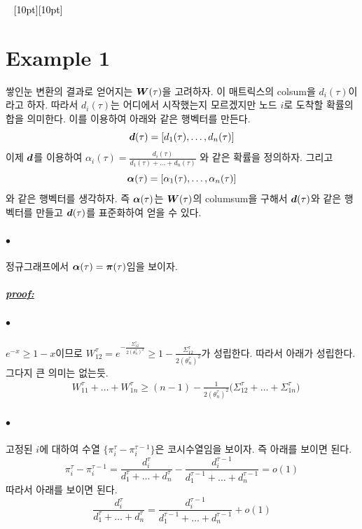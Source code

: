 \documentclass[12pt,oneside,english,a4paper]{article}
\newcommand{\dash}{\noindent \newline\textcolor{black}{\hrulefill~ \raisebox{-2.5pt}[10pt][10pt]{\leafright \decofourleft \decothreeleft  \aldineright \decotwo \floweroneleft \decoone   \floweroneright \decotwo \aldineleft\decothreeright \decofourright \leafleft} ~  \hrulefill}}
\def\ck{\paragraph{\LARGE$\bullet$}\LARGE}
\newcommand{\para}[1]{\paragraph{\LARGE\it\underline{\textbf{#1:}}}\LARGE}
\newcommand{\bs}[1]{\mbox{\boldmath $#1$}}
\newcommand{\bsd}{\mbox{\boldmath $d$}}
\newcommand{\bsW}{\mbox{\boldmath $W$}}
\begin{document}



\dash
\section{Example 1}
쌓인눈 변환의 결과로 얻어지는 $\bsW(\tau)$을 고려하자. 이 매트릭스의 colsum을 $d_i(\tau)$이라고 하자. 따라서 $d_i(\tau)$는 어디에서 시작했는지 모르겠지만 노드 $i$로 도착할 확률의 합을 의미한다. 이를 이용하여 아래와 같은 행벡터를 만든다. 
\[
\bsd(\tau)=[d_1(\tau),\dots,d_n(\tau)]
\]
이제 $\bsd$를 이용하여 
$
\alpha_i(\tau)=\frac{d_i(\tau)}{d_1(\tau)+\dots+d_n(\tau)}
$
와 같은 확률을 정의하자. 그리고 
\[
\bs{\alpha}(\tau)=[\alpha_1(\tau),\dots, \alpha_n(\tau)]\]
와 같은 행벡터를 생각하자. 즉 $\bs{\alpha}(\tau)$는 $\bsW(\tau)$의 columsum을 구해서 $\bsd(\tau)$와 같은 행벡터를 만들고 $\bsd(\tau)$를 표준화하여 얻을 수 있다. 

\ck 정규그래프에서 $\bs{\alpha}(\tau)=\bs{\pi}(\tau)$임을 보이자. 


\para{proof}
\ck $e^{-x} \geq 1-x $이므로 $W_{12}^{\tau}=e^{-\frac{\Sigma_{12}^\tau}{2(\theta_n^\tau)^2}}\geq 1-\frac{\Sigma_{12}^\tau}{2(\theta_n^\tau)^2}$가 성립한다. 따라서 아래가 성립한다. 그다지 큰 의미는 없는듯. 
\begin{align*}
& W_{11}^{\tau}+\dots+W_{1n}^{\tau} 
\geq (n-1)-\frac{1}{2(\theta_n^\tau)^2}\big(\Sigma_{12}^{\tau}+\dots+\Sigma_{1n}^{\tau}\big)
\end{align*}

\ck 고정된 $i$에 대하여 수열 $\big\{\pi_i^{\tau}-\pi_i^{\tau-1}\big\}$은 코시수열임을 보이자. 즉 아래를 보이면 된다. 
\[
\pi_i^{\tau}-\pi_i^{\tau-1}=\frac{d_i^{\tau}}{d_1^{\tau}+\dots+d_n^{\tau}}-\frac{d_i^{\tau-1}}{d_1^{\tau-1}+\dots+d_n^{\tau-1}}=o(1)
\]
따라서 아래를 보이면 된다. 
\[
\frac{d_i^{\tau}}{d_1^{\tau}+\dots+d_n^{\tau}}=\frac{d_i^{\tau-1}}{d_1^{\tau-1}+\dots+d_n^{\tau-1}}+o(1)
\]
\end{document}

